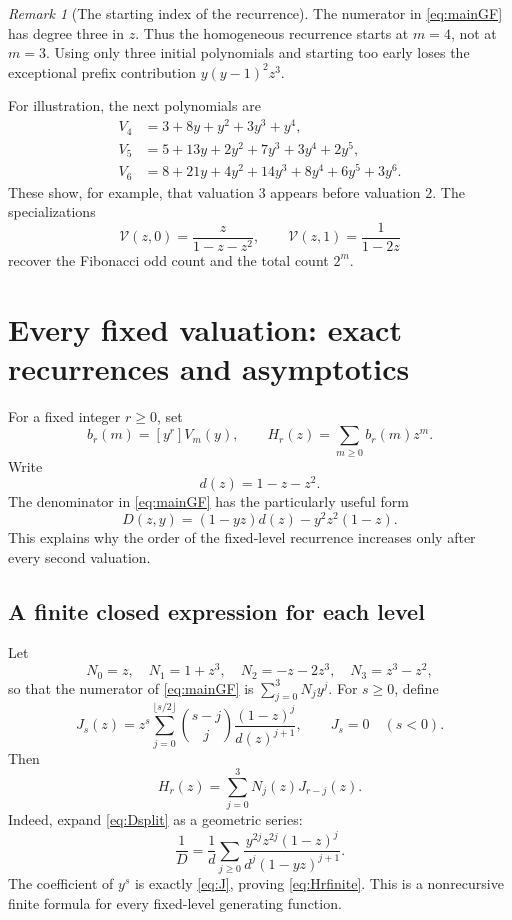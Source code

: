 \documentclass[11pt]{article}
\theoremstyle{definition}\newtheorem{definition}[theorem]{Definition}
\theoremstyle{remark}\newtheorem{remark}[theorem]{Remark}
\begin{document}
\begin{remark}[The starting index of the recurrence]
The numerator in \eqref{eq:mainGF} has degree three in $z$. Thus the
homogeneous recurrence starts at $m=4$, not at $m=3$. Using only three
initial polynomials and starting too early loses the exceptional prefix
contribution $y(y-1)^2z^3$.
\end{remark}

For illustration, the next polynomials are
\begin{align*}
 V_4&=3+8y+y^2+3y^3+y^4,\\
 V_5&=5+13y+2y^2+7y^3+3y^4+2y^5,\\
 V_6&=8+21y+4y^2+14y^3+8y^4+6y^5+3y^6.
\end{align*}
These show, for example, that valuation $3$ appears before valuation $2$.
The specializations
\begin{equation}\label{eq:specializations}
 \mathcal V(z,0)=\frac{z}{1-z-z^2},\qquad
 \mathcal V(z,1)=\frac1{1-2z}
\end{equation}
recover the Fibonacci odd count and the total count $2^m$.

\section{Every fixed valuation: exact recurrences and asymptotics}\label{sec:fixed}

For a fixed integer $r\geq0$, set
\[
 b_r(m)=[y^r]V_m(y),\qquad H_r(z)=\sum_{m\geq0}b_r(m)z^m.
\]
Write
\begin{equation}\label{eq:d}
 d(z)=1-z-z^2.
\end{equation}
The denominator in \eqref{eq:mainGF} has the particularly useful form
\begin{equation}\label{eq:Dsplit}
 D(z,y)=(1-yz)d(z)-y^2z^2(1-z).
\end{equation}
This explains why the order of the fixed-level recurrence increases
only after every second valuation.

\subsection{A finite closed expression for each level}
Let
\[
 N_0=z,\quad N_1=1+z^3,\quad N_2=-z-2z^3,\quad N_3=z^3-z^2,
\]
so that the numerator of \eqref{eq:mainGF} is $\sum_{j=0}^3N_jy^j$.
For $s\geq0$, define
\begin{equation}\label{eq:J}
 J_s(z)=z^s\sum_{j=0}^{\lfloor s/2\rfloor}
       \binom{s-j}{j}\frac{(1-z)^j}{d(z)^{j+1}},
 \qquad J_s=0\quad(s<0).
\end{equation}
Then
\begin{equation}\label{eq:Hrfinite}
 \boxed{\ H_r(z)=\sum_{j=0}^3N_j(z)J_{r-j}(z).\ }
\end{equation}
Indeed, expand \eqref{eq:Dsplit} as a geometric series:
\[
 \frac1D=\frac1d\sum_{j\geq0}
 \frac{y^{2j}z^{2j}(1-z)^j}{d^j(1-yz)^{j+1}}.
\]
The coefficient of $y^s$ is exactly \eqref{eq:J}, proving
\eqref{eq:Hrfinite}. This is a nonrecursive finite formula for every
fixed-level generating function.
\end{document}
